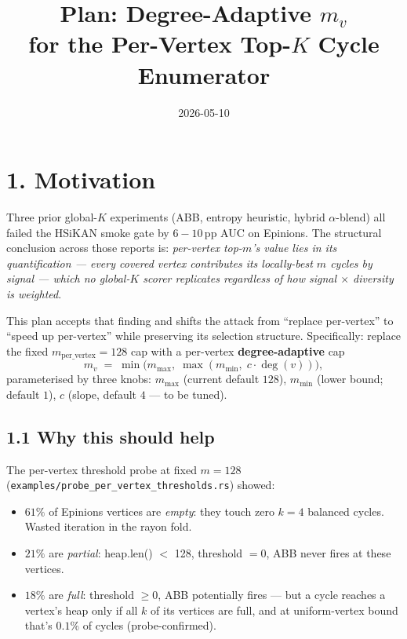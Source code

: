\documentclass[a4paper,11pt]{article}
\title{Plan: Degree-Adaptive $m_v$\\for the Per-Vertex Top-$K$ Cycle Enumerator}
\author{}
\date{2026-05-10}
\begin{document}
\maketitle

\section*{1. Motivation}

Three prior global-$K$ experiments (ABB, entropy heuristic, hybrid
$\alpha$-blend) all failed the HSiKAN smoke gate by $6{-}10$\,pp AUC
on Epinions.  The structural conclusion across those reports is:
\emph{per-vertex top-$m$'s value lies in its quantification — every
covered vertex contributes its locally-best $m$ cycles by signal —
which no global-$K$ scorer replicates regardless of how
signal $\times$ diversity is weighted}.

This plan accepts that finding and shifts the attack from
``replace per-vertex'' to ``speed up per-vertex'' while preserving
its selection structure.  Specifically: replace the fixed
$m_\text{per\_vertex} = 128$ cap with a per-vertex
\textbf{degree-adaptive} cap
\[
  m_v \;=\; \min\bigl(m_\text{max}, \;\max(m_\text{min}, \;c \cdot \deg(v))\bigr),
\]
parameterised by three knobs:
$m_\text{max}$ (current default $128$),
$m_\text{min}$ (lower bound; default $1$),
$c$ (slope, default $4$ — to be tuned).

\subsection*{1.1 Why this should help}

The per-vertex threshold probe at fixed $m{=}128$
(\texttt{examples/probe\_per\_vertex\_thresholds.rs}) showed:

\begin{itemize}
  \item $61\%$ of Epinions vertices are \emph{empty}: they touch zero
    $k{=}4$ balanced cycles. Wasted iteration in the rayon fold.
  \item $21\%$ are \emph{partial}: heap.len() $<$ 128, threshold $= 0$,
    ABB never fires at these vertices.
  \item $18\%$ are \emph{full}: threshold $\ge 0$, ABB potentially
    fires — but a cycle reaches a vertex's heap only if all $k$ of
    its vertices are full, and at uniform-vertex bound that's
    $0.1\%$ of cycles (probe-confirmed).
\end{itemize}
\end{document}
